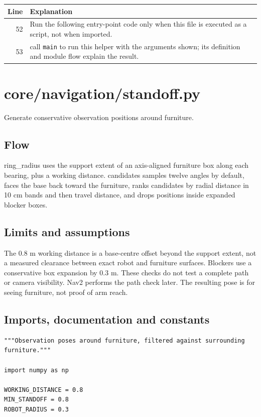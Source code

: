 \documentclass[11pt,a4paper]{book}
\begin{document}
\begin{longtable}{r p{}}

\textbf{Line} & \textbf{Explanation} \\ \hline \endhead

52 & Run the following entry-point code only when this file is executed as a script, not when imported. \\

53 & call \texttt{main} to run this helper with the arguments shown; its definition and module flow explain the result. \\

\end{longtable}

\chapter{core/navigation/standoff.py}

Generate conservative observation positions around furniture.

\section*{Flow}

ring\_radius uses the support extent of an axis-aligned furniture box along each bearing, plus a working distance. candidates samples twelve angles by default, faces the base back toward the furniture, ranks candidates by radial distance in 10 cm bands and then travel distance, and drops positions inside expanded blocker boxes.

\section*{Limits and assumptions}

The 0.8 m working distance is a base-centre offset beyond the support extent, not a measured clearance between exact robot and furniture surfaces. Blockers use a conservative box expansion by 0.3 m. These checks do not test a complete path or camera visibility. Nav2 performs the path check later. The resulting pose is for seeing furniture, not proof of arm reach.

\section{Imports, documentation and constants}

\begin{lstlisting}[firstnumber=1]
"""Observation poses around furniture, filtered against surrounding furniture."""

import numpy as np

WORKING_DISTANCE = 0.8
MIN_STANDOFF = 0.8
ROBOT_RADIUS = 0.3


\end{lstlisting}
\end{document}
